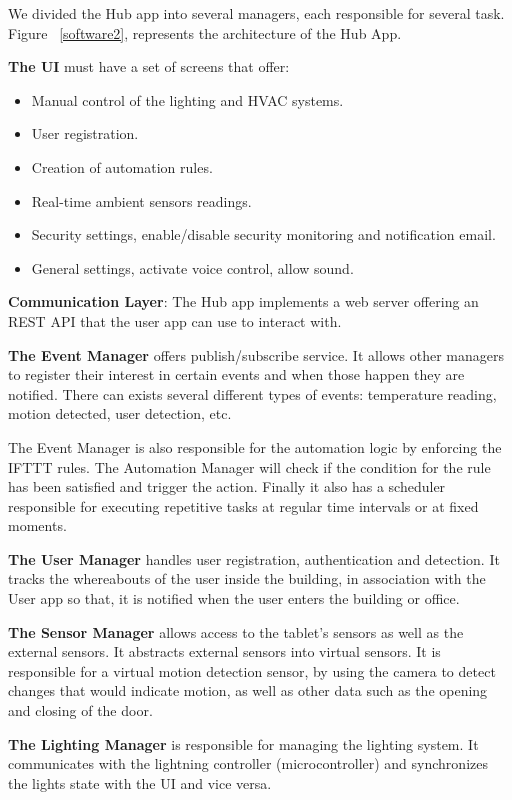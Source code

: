 \documentclass[conference]{IEEEtran}
\begin{document}
We divided the Hub app into several managers, each responsible for several task. Figure~ \ref{software2}, represents the architecture of the Hub App.

\textbf{The \ac{UI}} must have a set of screens that offer:

\begin{itemize}
  \item Manual control of the lighting and HVAC systems.
  \item User registration.
  \item Creation of automation rules.
  \item Real-time ambient sensors readings.
  \item Security settings, enable/disable security monitoring and notification email.
  \item General settings, activate voice control, allow sound.
   
\end{itemize}

\textbf{Communication Layer}: The Hub app implements a web server offering an \ac{REST} \ac{API} that the user app can use to interact with. 

\textbf{The Event Manager} offers publish/subscribe service. It allows other managers to register their interest in certain events and when those happen they are notified. There can exists several different types of events: temperature reading, motion detected, user detection, etc.

The Event Manager is also responsible for the automation logic by enforcing the \ac{IFTTT} rules. The Automation Manager will check if the condition for the rule has been satisfied and trigger the action. Finally it also has a scheduler responsible for executing repetitive tasks at regular time intervals or at fixed moments.


\textbf{The User Manager} handles user registration, authentication and detection. It tracks the whereabouts of the user inside the building, in association with the User app so that, it is notified when the user enters the building or office.


\textbf{The Sensor Manager} allows access to the tablet's sensors as well as the external sensors. It abstracts external sensors into virtual sensors. It is responsible for a virtual motion detection sensor, by using the camera to detect changes that would indicate motion, as well as other data such as the opening and closing of the door.


\textbf{The Lighting Manager} is responsible for managing the lighting system. It communicates with the lightning controller (microcontroller) and synchronizes the lights state with the \ac{UI} and vice versa.
\end{document}
